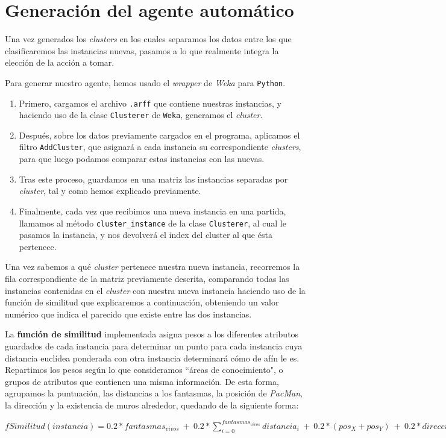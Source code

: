 \documentclass[12pt]{article}
\begin{document}
\newpage
\section{Generación del agente automático}

Una vez generados los \textit{clusters} en los cuales separamos los datos entre los que clasificaremos las instancias nuevas, pasamos a lo que realmente integra la elección de la acción a tomar.

Para generar nuestro agente, hemos usado el \textit{wrapper} de \textit{Weka} para \texttt{Python}.

\begin{enumerate}
    \item Primero, cargamos el archivo \texttt{.arff} que contiene nuestras instancias, y haciendo uso de la clase \texttt{Clusterer} de \texttt{Weka}, generamos el \textit{cluster}.
    \item Después, sobre los datos previamente cargados en el programa, aplicamos el filtro \texttt{AddCluster}, que asignará a cada instancia su correspondiente \textit{clusters}, para que luego podamos comparar estas instancias con las nuevas.
    \item Tras este proceso, guardamos en una matriz las instancias separadas por \textit{cluster}, tal y como hemos explicado previamente.
    \item Finalmente, cada vez que recibimos una nueva instancia en una partida, llamamos al método \texttt{cluster\_instance} de la clase \texttt{Clusterer}, al cual le pasamos la instancia, y nos devolverá el index del cluster al que ésta pertenece.
\end{enumerate}

Una vez sabemos a qué \textit{cluster} pertenece nuestra nueva instancia, recorremos la fila correspondiente de la matriz previamente descrita, comparando todas las instancias contenidas en el \textit{cluster} con nuestra nueva instancia haciendo uso de la función de similitud que explicaremos a continuación, obteniendo un valor numérico que indica el parecido que existe entre las dos instancias.


La \textbf{función de similitud} implementada asigna pesos a los diferentes atributos guardados de cada instancia para determinar un punto para cada instancia cuya distancia euclídea ponderada con otra instancia determinará cómo de afín le es. Repartimos los pesos según lo que consideramos ``áreas de conocimiento", o grupos de atributos que contienen una misma información. De esta forma, agrupamos la puntuación, las distancias a los fantasmas, la posición de \textit{PacMan}, la dirección y la existencia de muros alrededor, quedando de la siguiente forma:
\begin{center}
    $ fSimilitud(instancia) = 0.2 * fantasmas_{vivos}\ +\ 0.2 * \sum\limits_{i = 0}^{fantasmas_{vivos}} distancia_i\ +\ 0.2 *  (pos_X + pos_Y)\ +\ 0.2 * direccion\ +\ 0.2 * \sum\limits_{i = 0}^{dimension_{tablero}} hayMuro_i $
\end{center}
\end{document}
